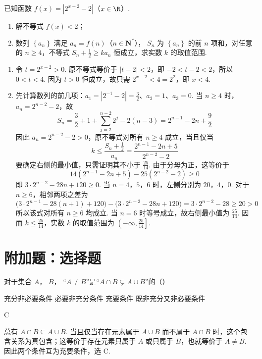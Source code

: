 \begin{problem}
已知函数 \( f(x)=\left|2^{x-2}-2\right|\)（\(x\in\R\)）.
\begin{enumerate}
\item 解不等式 \( f(x)<2 \)；
\item 数列 \( \left\{a_{n}\right\} \) 满足 \( a_{n}=f(n)\)（\(n\in\mathbf{N}^{*}\)）， \( S_{n} \) 为 \( \left\{a_{n}\right\} \) 的前 \(n\) 项和，对任意的 \( n\geq4 \)，不等式 \( S_{n}+\frac{1}{2}\geq ka_{n} \) 恒成立，求实数 \(k\) 的取值范围.
\end{enumerate}

\begin{solution}
\begin{enumerate}
\item 令 \(t=2^{x-2}>0\). 原不等式等价于 \(|t-2|<2\)，即 \(-2<t-2<2\)，所以 \(0<t<4\). 因为 \(t>0\) 恒成立，故只需 \(2^{x-2}<4=2^2\)，即 \(x<4\).

\item 先计算数列的前几项：\(a_1=\left|2^{-1}-2\right|=\frac32\)、\(a_2=1\)、\(a_3=0\). 当 \(n\geq4\) 时，\(a_n=2^{n-2}-2\)，故
\[
S_n=\frac32+1+\sum_{j=2}^{n-2}2^j-2(n-3)=2^{n-1}-2n+\frac92
\]
因此 \(a_n=2^{n-2}-2>0\)，原不等式对所有 \(n\geq4\) 成立，当且仅当
\[
k\leq\frac{S_n+\frac12}{a_n}=\frac{2^{n-1}-2n+5}{2^{n-2}-2}
\]
要确定右侧的最小值，只需证明其不小于 \(\frac{25}{14}\). 由于分母为正，这等价于
\[
14(2^{n-1}-2n+5)-25(2^{n-2}-2)\geq0
\]
即 \(3\cdot2^{n-2}-28n+120\geq0\). 当 \(n=4\)，\(5\)，\(6\) 时，左侧分别为 \(20\)，\(4\)，\(0\). 对于 \(n\geq6\)，相邻两项之差为
\[
\bigl(3\cdot2^{n-1}-28(n+1)+120\bigr)-\bigl(3\cdot2^{n-2}-28n+120\bigr)=3\cdot2^{n-2}-28\geq20>0
\]
所以该式对所有 \(n\geq6\) 均成立. 当 \(n=6\) 时等号成立，故右侧最小值为 \(\frac{25}{14}\). 因而 \(k\leq\frac{25}{14}\)，实数 \(k\) 的取值范围为 \(\left(-\infty,\frac{25}{14}\right]\).
\end{enumerate}
\end{solution}
\end{problem}

\section{附加题：选择题}

\begin{problem}
对于集合 \(A\)， \(B\)， “\( A \neq B \)”是“\( A \cap B \subsetneq A \cup B \)”的（\quad）

\choices
    {充分非必要条件}
    {必要非充分条件}
    {充要条件}
    {既非充分又非必要条件}

\begin{answer}
C
\end{answer}

\begin{solution}
总有 \(A\cap B\subseteq A\cup B\). 当且仅当存在元素属于 \(A\cup B\) 而不属于 \(A\cap B\) 时，这个包含关系为真包含；这等价于存在元素只属于 \(A\) 或只属于 \(B\)，也就等价于 \(A\neq B\). 因此两个条件互为充要条件，选 C.
\end{solution}
\end{problem}

